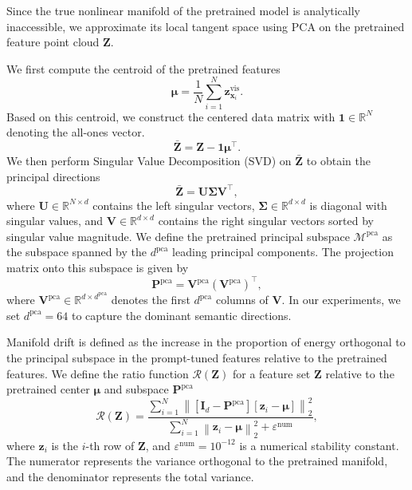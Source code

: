 \documentclass{article}
\theoremstyle{plain}
\theoremstyle{definition}
\theoremstyle{remark}
\begin{document}
	Since the true nonlinear manifold of the pretrained model is analytically inaccessible, we approximate its local tangent space using PCA on the pretrained feature point cloud $\mathbf{Z}$.
	
	We first compute the centroid of the pretrained features
	\begin{equation}
		\boldsymbol{\mu} = \frac{1}{N} \sum_{i=1}^N \mathbf{z}^{\mathrm{vis}}_{\mathbf{x}_i}.
		\label{eq:drift_mu}
	\end{equation}
	Based on this centroid, we construct the centered data matrix
	with $\mathbf{1}\in\mathbb{R}^{N}$ denoting the all-ones vector.
	\begin{equation}
		\bar{\mathbf{Z}} = \mathbf{Z} - \mathbf{1}\boldsymbol{\mu}^\top.
		\label{eq:drift_center_pre}
	\end{equation}
	We then perform Singular Value Decomposition (SVD) on $\bar{\mathbf{Z}}$ to obtain the principal directions
	\begin{equation}
		\bar{\mathbf{Z}} = \mathbf{U} \mathbf{\Sigma} \mathbf{V}^\top,
		\label{eq:drift}
	\end{equation}
	where $\mathbf{U}\in\mathbb{R}^{N\times d}$ contains the left singular vectors, $\mathbf{\Sigma}\in\mathbb{R}^{d\times d}$ is diagonal with singular values, and $\mathbf{V} \in \mathbb{R}^{d \times d}$ contains the right singular vectors sorted by singular value magnitude. We define the pretrained principal subspace $\mathcal{M}^{\mathrm{pca}}$ as the subspace spanned by the $d^{\mathrm{pca}}$ leading principal components. The projection matrix onto this subspace is given by
	\begin{equation}
		\mathbf{P}^{\mathrm{pca}} = \mathbf{V}^{\mathrm{pca}} \left(\mathbf{V}^{\mathrm{pca}}\right)^\top,
		\label{eq:drift_proj}
	\end{equation}
	where $\mathbf{V}^{\mathrm{pca}} \in \mathbb{R}^{d \times d^{\mathrm{pca}}}$ denotes the first $d^{\mathrm{pca}}$ columns of $\mathbf{V}$. In our experiments, we set $d^{\mathrm{pca}}=64$ to capture the dominant semantic directions.
	
	Manifold drift is defined as the increase in the proportion of energy orthogonal to the principal subspace in the prompt-tuned features relative to the pretrained features. We define the ratio function $\mathcal{R}(\mathbf{Z})$ for a feature set $\mathbf{Z}$ relative to the pretrained center $\boldsymbol{\mu}$ and subspace $\mathbf{P}^{\mathrm{pca}}$
	\begin{equation}
		\mathcal{R}(\mathbf{Z}) =
		\frac{\sum_{i=1}^N \left\| \left[\mathbf{I}_d - \mathbf{P}^{\mathrm{pca}}\right]\left[\mathbf{z}_i - \boldsymbol{\mu}\right] \right\|_2^2}
		{\sum_{i=1}^N \left\| \mathbf{z}_i - \boldsymbol{\mu} \right\|_2^2 + \varepsilon^{\mathrm{num}}},
		\label{eq:drift_ratio}
	\end{equation}
	where $\mathbf{z}_i$ is the $i$-th row of $\mathbf{Z}$, and $\varepsilon^{\mathrm{num}}=10^{-12}$ is a numerical stability constant. The numerator represents the variance orthogonal to the pretrained manifold, and the denominator represents the total variance.
	
\end{document}
